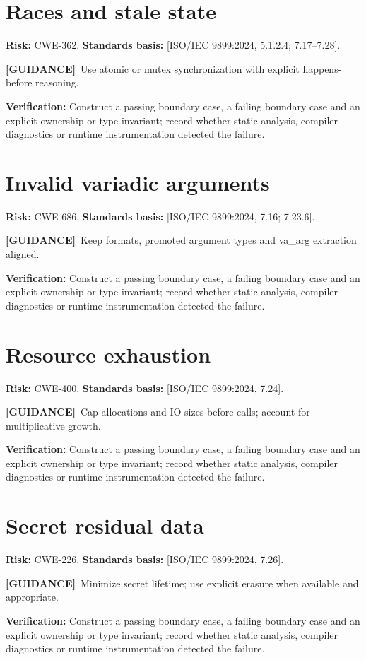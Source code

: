 \documentclass[10pt,letterpaper,oneside]{report}
\newcommand{\refcl}[1]{\textsf{\footnotesize[ISO/IEC 9899:2024, #1]}}
\newcommand{\guidance}{\textbf{[GUIDANCE]}}
\begin{document}
\section{Races and stale state}
\textbf{Risk:} CWE-362. \textbf{Standards basis:} \refcl{5.1.2.4; 7.17--7.28}.\par\guidance\ Use atomic or mutex synchronization with explicit happens-before reasoning.\par\textbf{Verification:} Construct a passing boundary case, a failing boundary case and an explicit ownership or type invariant; record whether static analysis, compiler diagnostics or runtime instrumentation detected the failure.
\section{Invalid variadic arguments}
\textbf{Risk:} CWE-686. \textbf{Standards basis:} \refcl{7.16; 7.23.6}.\par\guidance\ Keep formats, promoted argument types and va\_arg extraction aligned.\par\textbf{Verification:} Construct a passing boundary case, a failing boundary case and an explicit ownership or type invariant; record whether static analysis, compiler diagnostics or runtime instrumentation detected the failure.
\section{Resource exhaustion}
\textbf{Risk:} CWE-400. \textbf{Standards basis:} \refcl{7.24}.\par\guidance\ Cap allocations and IO sizes before calls; account for multiplicative growth.\par\textbf{Verification:} Construct a passing boundary case, a failing boundary case and an explicit ownership or type invariant; record whether static analysis, compiler diagnostics or runtime instrumentation detected the failure.
\section{Secret residual data}
\textbf{Risk:} CWE-226. \textbf{Standards basis:} \refcl{7.26}.\par\guidance\ Minimize secret lifetime; use explicit erasure when available and appropriate.\par\textbf{Verification:} Construct a passing boundary case, a failing boundary case and an explicit ownership or type invariant; record whether static analysis, compiler diagnostics or runtime instrumentation detected the failure.
\end{document}
